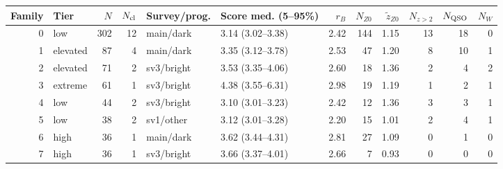 \begin{ruledtabular}
\begin{tabular}{r l r r l l r r r r r r}
Family & Tier & $N$ & $N_{\rm cl}$ & Survey/prog. & Score med. (5--95\%) & $r_B$ & $N_{Z0}$ & $\tilde z_{Z0}$ & $N_{z>2}$ & $N_{\rm QSO}$ & $N_{W}$ \\
\hline
0 & low & 302 & 12 & main/dark & 3.14 (3.02--3.38) & 2.42 & 144 & 1.15 & 13 & 18 & 0 \\
1 & elevated & 87 & 4 & main/dark & 3.35 (3.12--3.78) & 2.53 & 47 & 1.20 & 8 & 10 & 1 \\
2 & elevated & 71 & 2 & sv3/bright & 3.53 (3.35--4.06) & 2.60 & 18 & 1.36 & 2 & 4 & 2 \\
3 & extreme & 61 & 1 & sv3/bright & 4.38 (3.55--6.31) & 2.98 & 19 & 1.19 & 1 & 2 & 1 \\
4 & low & 44 & 2 & sv3/bright & 3.10 (3.01--3.23) & 2.42 & 12 & 1.36 & 3 & 3 & 1 \\
5 & low & 38 & 2 & sv1/other & 3.12 (3.01--3.28) & 2.20 & 15 & 1.01 & 2 & 4 & 1 \\
6 & high & 36 & 1 & main/dark & 3.62 (3.44--4.31) & 2.81 & 27 & 1.09 & 0 & 1 & 0 \\
7 & high & 36 & 1 & sv3/bright & 3.66 (3.37--4.01) & 2.66 & 7 & 0.93 & 0 & 0 & 0 \\
\end{tabular}
\end{ruledtabular}
